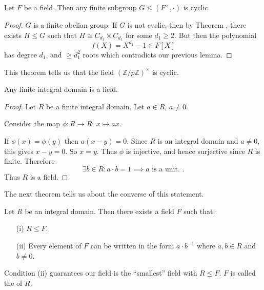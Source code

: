 \documentclass[egregdoesnotlikesansseriftitles,a4paper]{scrartcl}
\begin{document}
\begin{theorem}
       Let $F$ be a field. Then any finite subgroup $G \leq (F^{\times},\cdot )$ is cyclic.
       \begin{proof}
            $G$ is a finite abelian group. If $G$ is not cyclic, then by Theorem , there exists $H \leq G$ such that $H \cong C_{d_1 }\times C_{d_1 }      $ for some $d_1 \geq 2$. But then the polynomial \[
            f (X)=X^{d_1 }-1 \in F[X]
            \] has degree $d_1 $, and $\geq d_1^2$ roots which contradicts our previous lemma.
     \end{proof}
     \begin{example*}
           This theorem tells us that the field $(\mathbb{Z}/p\mathbb{Z})^{\times}$ is cyclic. 
     \end{example*}
\end{theorem}
\begin{proposition}
       Any finite integral domain is a field.
       \begin{proof}
            Let $R$ be a finite integral domain. Let $a \in R$, $a \neq 0$.
     
            Consider the map $\phi : R \rightarrow R$: $x \mapsto ax$.
     
            If $\phi (x)=\phi (y)$ then $a (x-y)=0$. Since $R$ is an integral domain and $a \neq 0$, this gives $x-y=0$. So $x=y$. Thus $\phi $ is injective, and hence surjective since $R$ is finite. Therefore \[
            \exists b \in R: a \cdot b=1 \implies a \text{ is a unit. } 
            .\] Thus $R$ is a field.
     \end{proof}
\end{proposition}
The next theorem tells us about the converse of this statement.
\begin{theorem}
       Let $R$ be an integral domain. Then there exists a field $F$ such that:
       \begin{itemize}
             \item[(i)] $R \leq F$.
             \item[(ii)] Every element of $F$ can be written in the form $a \cdot b^{-1}$ where $a,b \in R$ and $b \neq 0$.
       \end{itemize}
       \begin{remark}
            Condition (ii) guarantees our field is the ``smallest'' field with $R \leq F$. $F$ is called the  of $R$.
       \end{remark}
\end{theorem}
\end{document}
